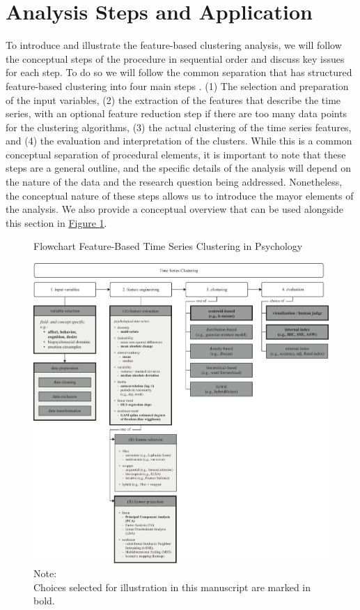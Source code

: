 \documentclass[man, 12pt, a4paper, mask, floatsintext]{apa7}
\theoremstyle{break}
\theoremstyle{plain}
\newcommand{\fgrref}[2][]{\hyperref[#2]{Figure \ref*{#2}#1}}
\begin{document}


\section{Analysis Steps and Application} 

To introduce and illustrate the feature-based clustering analysis, we will follow the conceptual steps of the procedure in sequential order and discuss key issues for each step. To do so we will follow the common separation that has structured feature-based clustering into four main steps \citep{rasanen2009, wang2006}. (1) The selection and preparation of the input variables, (2) the extraction of the features that describe the time series, with an optional feature reduction step if there are too many data points for the clustering algorithms, (3) the actual clustering of the time series features, and (4) the evaluation and interpretation of the clusters. 
While this is a common conceptual separation of procedural elements, it is important to note that these steps are a general outline, and the specific details of the analysis will depend on the nature of the data and the research question being addressed. Nonetheless, the conceptual nature of these steps allows us to introduce the mayor elements of the analysis. We also provide a conceptual overview that can be used alongside this section in \fgrref{fig:TSCFlow}.

\begin{figure}[!ht] %
  \caption{Flowchart Feature-Based Time Series Clustering in Psychology}
  \label{fig:TSCFlow}
  \centering\includegraphics[width=\textwidth]{figures/TS Cluster Flow/TimeSeriesClusterFlowSelection.pdf}
  \caption*{Note: \\
  Choices selected for illustration in this manuscript are marked in bold.}
\end{figure}
\end{document}
